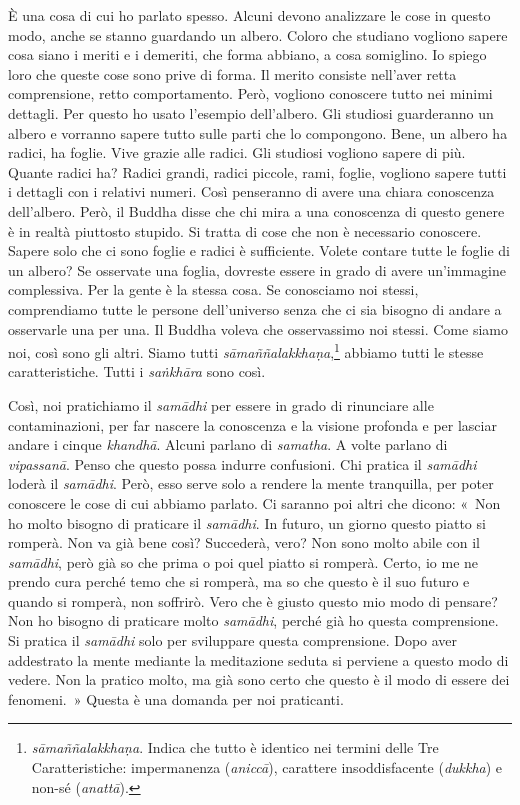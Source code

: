 È una cosa di cui ho parlato spesso. Alcuni devono analizzare le cose in
questo modo, anche se stanno guardando un albero. Coloro che studiano
vogliono sapere cosa siano i meriti e i demeriti, che forma abbiano, a
cosa somiglino. Io spiego loro che queste cose sono prive di forma. Il
merito consiste nell'aver retta comprensione, retto comportamento. Però,
vogliono conoscere tutto nei minimi dettagli. Per questo ho usato
l'esempio dell'albero. Gli studiosi guarderanno un albero e vorranno
sapere tutto sulle parti che lo compongono. Bene, un albero ha radici,
ha foglie. Vive grazie alle radici. Gli studiosi vogliono sapere di più.
Quante radici ha? Radici grandi, radici piccole, rami, foglie, vogliono
sapere tutti i dettagli con i relativi numeri. Così penseranno di avere
una chiara conoscenza dell'albero. Però, il Buddha disse che chi mira a
una conoscenza di questo genere è in realtà piuttosto stupido. Si tratta
di cose che non è necessario conoscere. Sapere solo che ci sono foglie e
radici è sufficiente. Volete contare tutte le foglie di un albero? Se
osservate una foglia, dovreste essere in grado di avere un'immagine
complessiva. Per la gente è la stessa cosa. Se conosciamo noi stessi,
comprendiamo tutte le persone dell'universo senza che ci sia bisogno di
andare a osservarle una per una. Il Buddha voleva che osservassimo noi
stessi. Come siamo noi, così sono gli altri. Siamo tutti
\emph{sāmaññalakkhaṇa},\footnote{\emph{sāmaññalakkhaṇa}. Indica che
  tutto è identico nei termini delle Tre Caratteristiche: impermanenza
  (\emph{aniccā}), carattere insoddisfacente (\emph{dukkha}) e non-sé
  (\emph{anattā}).} abbiamo tutti le stesse caratteristiche. Tutti i
\emph{saṅkhāra} sono così.

Così, noi pratichiamo il \emph{samādhi} per essere in grado di
rinunciare alle contaminazioni, per far nascere la conoscenza e la
visione profonda e per lasciar andare i cinque \emph{khandhā}. Alcuni
parlano di \emph{samatha}. A volte parlano di \emph{vipassanā}. Penso
che questo possa indurre confusioni. Chi pratica il \emph{samādhi}
loderà il \emph{samādhi}. Però, esso serve solo a rendere la mente
tranquilla, per poter conoscere le cose di cui abbiamo parlato. Ci
saranno poi altri che dicono: «~Non ho molto bisogno di praticare il
\emph{samādhi}. In futuro, un giorno questo piatto si romperà. Non va
già bene così? Succederà, vero? Non sono molto abile con il
\emph{samādhi}, però già so che prima o poi quel piatto si romperà.
Certo, io me ne prendo cura perché temo che si romperà, ma so che questo
è il suo futuro e quando si romperà, non soffrirò. Vero che è giusto
questo mio modo di pensare? Non ho bisogno di praticare molto
\emph{samādhi}, perché già ho questa comprensione. Si pratica il
\emph{samādhi} solo per sviluppare questa comprensione. Dopo aver
addestrato la mente mediante la meditazione seduta si perviene a questo
modo di vedere. Non la pratico molto, ma già sono certo che questo è il
modo di essere dei fenomeni.~» Questa è una domanda per noi praticanti.

